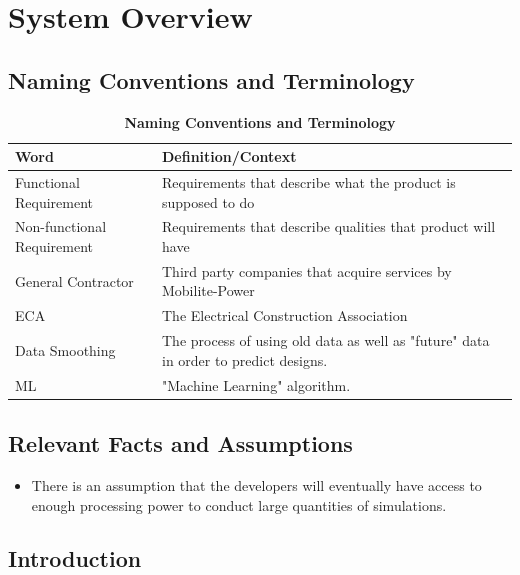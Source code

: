 \documentclass[12pt, titlepage]{article}
\begin{document}
\section{System Overview}

\subsection{Naming Conventions and Terminology}

\begin{table}[H]
\caption{\bf Naming Conventions and Terminology}
\begin{tabular}{ |p{6cm}|p{8cm}|  } 
 \hline
\bf Word & \bf Definition/Context\\
 \hline
 Functional Requirement & Requirements that describe what the product is supposed to do\\
 \hline
Non-functional Requirement & Requirements that describe qualities that product will have\\
 \hline
General Contractor & Third party companies that acquire services by Mobilite-Power\\
  \hline
ECA & The Electrical Construction Association\\
\hline
Data Smoothing & The process of using old data as well as "future" data in order to predict designs.\\
\hline
ML & "Machine Learning" algorithm.\\
\hline
\end{tabular}
\end{table}

\subsection{Relevant Facts and Assumptions}
\begin{itemize}
    \item There is an assumption that the developers will eventually have access to enough processing power to conduct large quantities of simulations.

\end{itemize}

\subsection{Introduction}
\end{document}
